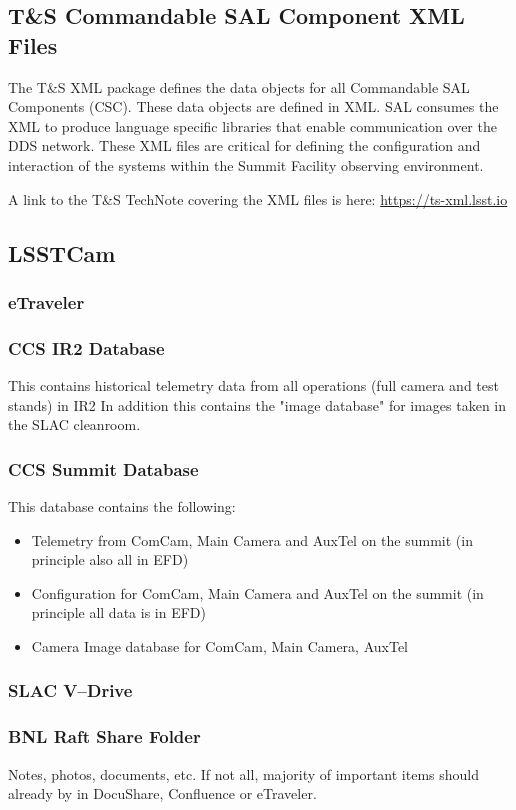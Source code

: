 \subsection{T\&S Commandable SAL Component XML Files}

The T\&S XML package defines the data objects for all Commandable SAL Components (CSC). These data objects are defined in XML. SAL consumes the XML to produce language specific libraries that enable communication over the DDS network.  These XML files are critical for defining the configuration and interaction of the systems within the Summit Facility observing environment.

A link to the T\&S TechNote covering the XML files is here: \url{https://ts-xml.lsst.io}

\subsection{LSSTCam}
	\subsubsection{eTraveler}
	\subsubsection{CCS IR2 Database}
	This contains historical telemetry data from all operations (full camera and test stands) in IR2 In addition this contains the "image database" for images taken in the SLAC cleanroom.
	\subsubsection{CCS Summit Database}
	This database contains the following:
	\begin{itemize}
		\item Telemetry from ComCam, Main Camera and AuxTel on the summit (in principle also all in EFD)
		\item Configuration for ComCam, Main Camera and AuxTel on the summit (in principle all data is in EFD)
		\item Camera Image database for ComCam, Main Camera, AuxTel
	\end{itemize}

	\subsubsection{SLAC V--Drive}
	
	\subsubsection{BNL Raft Share Folder}
	Notes, photos, documents, etc. If not all, majority of important items should already by in DocuShare, Confluence or eTraveler.
	
